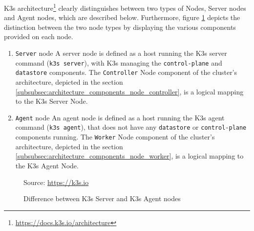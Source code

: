 K3s architecture\footnote{\url{https://docs.k3s.io/architecture}} clearly
distinguishes between two types of Nodes, Server nodes and Agent nodes, which
are described below. Furthermore, figure \ref{fig:k3s} depicts the distinction
between the two node types by displaying the various components provided on each
node.
\begin{enumerate}
  \item \texttt{Server} node
    \newline
    A server node is defined as a host running the K3s server command (\lstinline[language=shell,
    basicstyle=\ttfamily, morekeywords={[2]{k3s}}, morekeywords={[3]{server}}]{k3s server}),
    with K3s managing the \texttt{control-plane} and \texttt{datastore}
    components.
    \newline
    The \texttt{Controller} Node component of the cluster's architecture, depicted
    in the section \ref{subsubsec:architecture_components_node_controller}, is a
    logical mapping to the K3s Server Node.

  \item \texttt{Agent} node
    \newline
    An agent node is defined as a host running the K3s agent command (\lstinline[language=shell,
    basicstyle=\ttfamily, morekeywords={[2]{k3s}}, morekeywords={[3]{agent}}]{k3s agent}),
    that does not have any \texttt{datastore} or \texttt{control-plane}
    components running.
    \newline
    The \texttt{Worker} Node component of the cluster's architecture, depicted in
    the section \ref{subsubsec:architecture_components_node_worker}, is a
    logical mapping to the K3s Agent Node.
\end{enumerate}

\begin{figure}[htbp]
  \centering
  \vspace{.5em}
  \def\stackalignment{r} %
  {\scriptsize Source: \url{https://k3s.io} }
  \caption{Difference between K3s Server and K3s Agent nodes}
  \label{fig:k3s}
\end{figure}

